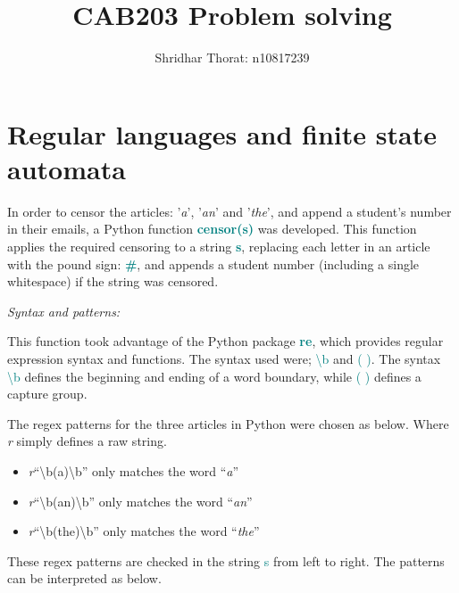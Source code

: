 \documentclass[a4paper]{article}
\author{Shridhar Thorat: n10817239}
\title{CAB203 Problem solving}
\begin{document}
\maketitle
\date{}

\section{Regular languages and finite state automata}
In order to censor the articles: '\emph{a}', '\emph{an}' and  '\emph{the}', and append a student's number in their emails, a Python function \textcolor{teal}{\textbf{censor(s)}} was developed. This function applies the required censoring to a string \textcolor{teal}{\textbf{s}}, replacing each letter in an article with the pound sign: \textcolor{teal}{\textbf{\#}}, and appends a student number (including a single whitespace) if the string was censored.
\vspace{5mm}

\noindent
\emph{Syntax and patterns:}
\vspace{2mm}

\noindent
This function took advantage of the Python package \textcolor{teal}{\textbf{re}}, which provides regular expression syntax and functions. The syntax used were; \textcolor{teal}{\textbackslash b} and \textcolor{teal}{( )}. The syntax \textcolor{teal}{\textbackslash b} defines the beginning and ending of a word boundary, while \textcolor{teal}{( )} defines a capture group.

The regex patterns for the three articles in Python were chosen as below. Where \emph{r} simply defines a raw string.
\begin{center}
    \begin{minipage}[c]{1\linewidth}
        \begin{itemize}
            \item \emph{r}\enquote{\textbackslash b(a)\textbackslash b} only matches the word \enquote{\emph{a}}
            \item \emph{r}\enquote{\textbackslash b(an)\textbackslash b} only matches the word \enquote{\emph{an}}
            \item \emph{r}\enquote{\textbackslash b(the)\textbackslash b} only matches the word \enquote{\emph{the}}
        \end{itemize} 
    \end{minipage}
\end{center}
These regex patterns are checked in the string \textcolor{teal}{s} from left to right. The patterns can be interpreted as below.
\end{document}
